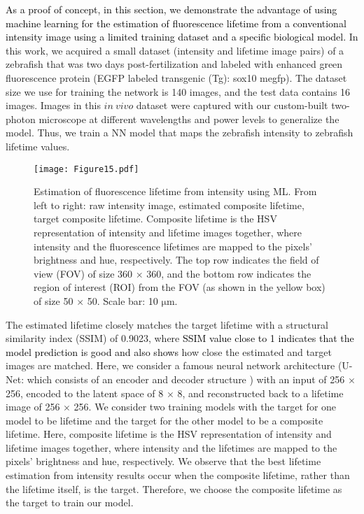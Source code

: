 \documentclass[12pt]{iopart}
\newcommand{\cc}[1]{\textcolor{black}{#1}}
\begin{document}
\cc{As a proof of concept, in this section, we demonstrate the advantage of using machine learning for the estimation of fluorescence lifetime from a conventional intensity image using a limited training dataset and a specific biological model.}
In this work, we acquired a small dataset (intensity and lifetime image pairs) of a zebrafish that was two days post-fertilization and labeled with enhanced green fluorescence protein (EGFP labeled transgenic (Tg): sox10 megfp). The dataset size we use for training the network is 140 images, and the test data contains 16 images. Images in this $in~vivo$ dataset were captured with our custom-built two-photon microscope \cite{instant_flim} at different wavelengths and power levels to generalize the model. Thus, we train a NN model that maps the zebrafish intensity to zebrafish lifetime values.

\begin{figure}[!t]
\centering
\texttt{[image: Figure15.pdf]}
\caption{Estimation of fluorescence lifetime from intensity using ML. From left to right: raw intensity image, estimated composite lifetime, target composite lifetime. Composite lifetime is the HSV representation of intensity and lifetime images together, where intensity and the fluorescence lifetimes are mapped to the pixels’ brightness and hue, respectively. The top row indicates the field of view (FOV) of size 360 $\times$ 360, and the bottom row indicates the region of interest (ROI) from the FOV (as shown in the yellow box) of size 50 $\times$ 50. Scale bar: 10 $\mathrm{\mu}$m.}\label{Fig2_PD}
\end{figure}

The estimated lifetime closely matches the target lifetime with a structural similarity index (SSIM) \cite{wang2004image_SSIM} of 0.9023, where \cc{SSIM value close to 1 indicates that the model prediction is good and also shows} how close the estimated and target images are matched. Here, we consider a famous neural network architecture (U-Net: which consists of an encoder and decoder structure \cite{mannam2020performance}) with an input of 256 $\times$ 256, encoded to the latent space of 8 $\times$ 8, and reconstructed back to a lifetime image of 256 $\times$ 256. We consider two training models with the target for one model to be lifetime and the target for the other model to be a composite lifetime. Here, composite lifetime is the HSV representation of intensity and lifetime images together, where intensity and the lifetimes are mapped to the pixels’ brightness and hue, respectively. We observe that the best lifetime estimation from intensity results occur when the composite lifetime, rather than the lifetime itself, is the target. Therefore, we choose the composite lifetime as the target to train our model. 
\end{document}
